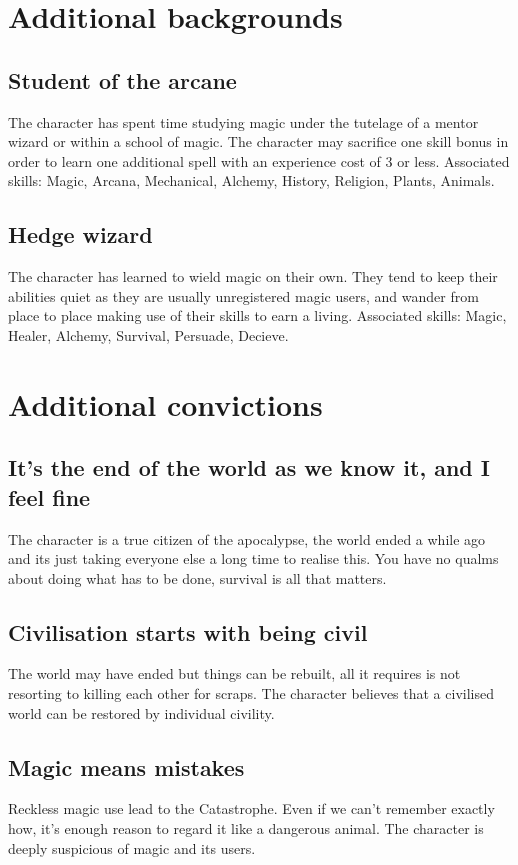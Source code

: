 \documentclass[a4paper,11pt,oneside]{book}
\begin{document}
\section{Additional backgrounds}

\subsection{Student of the arcane}
The character has spent time studying magic under the tutelage of a mentor wizard or within a school of magic. The character may sacrifice one skill bonus in order to learn one additional spell with an experience cost of 3 or less. Associated skills: Magic, Arcana, Mechanical, Alchemy, History, Religion, Plants, Animals.

\subsection{Hedge wizard}
The character has learned to wield magic on their own. They tend to keep their abilities quiet as they are usually unregistered magic users, and wander from place to place making use of their skills to earn a living. Associated skills: Magic, Healer, Alchemy, Survival, Persuade, Decieve. 


\section{Additional convictions}

\subsection{It's the end of the world as we know it, and I feel fine}
The character is a true citizen of the apocalypse, the world ended a while ago and its just taking everyone else a long time to realise this. You have no qualms about doing what has to be done, survival is all that matters.

\subsection{Civilisation starts with being civil}
The world may have ended but things can be rebuilt, all it requires is not resorting to killing each other for scraps. The character believes that a civilised world can be restored by individual civility.

\subsection{Magic means mistakes}
Reckless magic use lead to the Catastrophe. Even if we can't remember exactly how, it's enough reason to regard it like a dangerous animal. The character is deeply suspicious of magic and its users.
\end{document}
